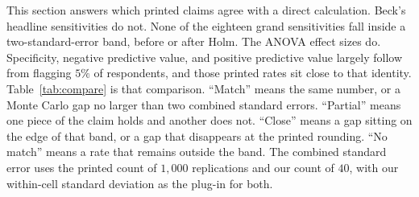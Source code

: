 \documentclass[11pt]{article}
\begin{document}
This section answers which printed claims agree with a direct
calculation.
Beck's headline sensitivities do not.
None of the eighteen grand sensitivities fall inside a
two-standard-error band, before or after Holm.
The ANOVA effect sizes do.
Specificity, negative predictive value, and positive predictive value
largely follow from flagging \(5\%\) of respondents, and those printed
rates sit close to that identity.
Table~\ref{tab:compare} is that comparison.
``Match'' means the same number, or a Monte Carlo gap no larger than
two combined standard errors.
``Partial'' means one piece of the claim holds and another does not.
``Close'' means a gap sitting on the edge of that band, or a gap that
disappears at the printed rounding.
``No match'' means a rate that remains outside the band.
The combined standard error uses the printed count of \(1{,}000\)
replications and our count of \(40\), with our within-cell standard
deviation as the plug-in for both.
\end{document}
